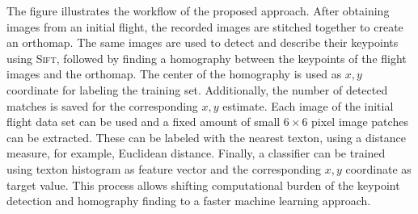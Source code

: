 \label{fig:overview}
The figure illustrates
    the workflow of the proposed approach. After obtaining images from an initial flight,
    the recorded images are stitched together to create an orthomap. The same
    images are used to detect and describe their keypoints using
    \textsc{Sift}, followed by finding a homography between the keypoints of the flight
    images and the orthomap. The center of the homography is used as
    $x, y$ coordinate for labeling the training set. Additionally, the
    number of detected matches is saved for the corresponding $x, y$
    estimate. Each image of the initial flight data set can be used
    and a fixed amount of small $6\times6$ pixel image patches can be
    extracted. These can be labeled with the nearest texton, using a
    distance measure, for example, Euclidean distance. Finally, a
    classifier can be trained using texton histogram as feature vector
    and the corresponding $x, y$ coordinate as target value. This
    process allows shifting computational burden of the keypoint detection and homography finding to a faster machine learning
    approach.